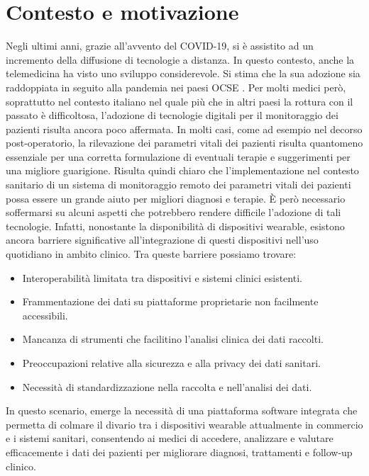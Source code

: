\documentclass[12pt,a4paper,oneside]{report}
\begin{document}
\section{Contesto e motivazione}
Negli ultimi anni, grazie all'avvento del COVID-19, si è assistito ad un incremento della diffusione di tecnologie a distanza. In questo contesto, anche la telemedicina ha visto uno sviluppo considerevole. Si stima che la sua adozione sia raddoppiata in seguito alla pandemia nei paesi OCSE \cite{msd2025}.
Per molti medici però, soprattutto nel contesto italiano nel quale più che in altri paesi la rottura con il passato è difficoltosa, l'adozione di tecnologie digitali per il monitoraggio dei pazienti risulta ancora poco affermata\cite{anastasio2023}.
In molti casi, come ad esempio nel decorso post-operatorio, la rilevazione dei parametri vitali dei pazienti risulta quantomeno essenziale per una corretta formulazione di eventuali terapie e suggerimenti per una migliore guarigione.
Risulta quindi chiaro che l'implementazione nel contesto sanitario di un sistema di monitoraggio remoto dei parametri vitali dei pazienti possa essere un grande aiuto per migliori diagnosi e terapie.
È però necessario soffermarsi su alcuni aspetti che potrebbero rendere difficile l'adozione di tali tecnologie. Infatti, nonostante la disponibilità di dispositivi wearable, esistono ancora barriere significative all'integrazione di questi dispositivi nell'uso quotidiano in ambito clinico. Tra queste barriere possiamo trovare:

\begin{itemize}
  \item Interoperabilità limitata tra dispositivi e sistemi clinici esistenti.
  \item Frammentazione dei dati su piattaforme proprietarie non facilmente accessibili.
  \item Mancanza di strumenti che facilitino l'analisi clinica dei dati raccolti.
  \item Preoccupazioni relative alla sicurezza e alla privacy dei dati sanitari.
  \item Necessità di standardizzazione nella raccolta e nell'analisi dei dati.
\end{itemize}

In questo scenario, emerge la necessità di una piattaforma software integrata che permetta di colmare il divario tra i dispositivi wearable attualmente in commercio e i sistemi sanitari, consentendo ai medici di accedere, analizzare e valutare efficacemente i dati dei pazienti per migliorare diagnosi, trattamenti e follow-up clinico.
\end{document}
